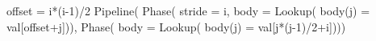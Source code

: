 \begin{juliacode}
offset = i*(i-1)/2
Pipeline(
  Phase(
    stride = i,
    body = Lookup(
      body(j) = val[offset+j])),
  Phase(
    body = Lookup(
      body(j) = val[j*(j-1)/2+i])))
\end{juliacode}
